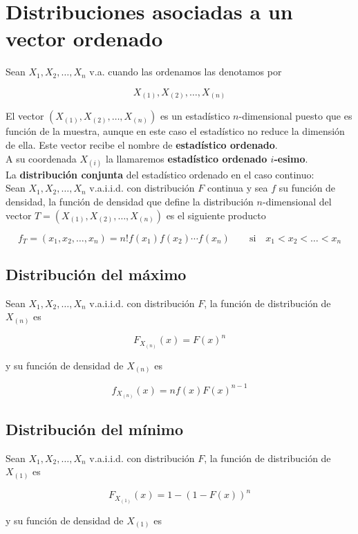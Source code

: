 \documentclass{article}
\begin{document}
\section{Distribuciones asociadas a un vector ordenado}


Sean $X_1, X_2, \dots, X_n$ v.a. cuando las ordenamos las denotamos por

\[ X_{(1)}, X_{(2)}, \dots, X_{(n)} \]

El vector $(X_{(1)}, X_{(2)}, \dots, X_{(n)})$ es un estadístico $n$-dimensional puesto que es función de la muestra, aunque en este caso el estadístico
no reduce la dimensión de ella. Este vector recibe el nombre de \textbf{estadístico ordenado}. \\
A su coordenada $X_{(i)}$ la llamaremos \textbf{estadístico ordenado $i$-esimo}. \\

La \textbf{distribución conjunta} del estadístico ordenado en el caso continuo: \\
Sean $X_1, X_2, \dots, X_n$ v.a.i.i.d. con distribución $F$ continua y sea $f$ su función de densidad, la función de densidad que define la distribución $n$-dimensional
del vector $T = (X_{(1)}, X_{(2)}, \dots, X_{(n)})$ es el siguiente producto

\[ f_T=(x_1, x_2, \dots, x_n) = n!f(x_1)f(x_2)\dotsb f(x_n) \qquad \text{si} \quad x_1 < x_2 < \dots < x_n \]

\subsection{Distribución del máximo}

Sean $X_1, X_2, \dots, X_n$ v.a.i.i.d. con distribución $F$, la función de distribución de $X_{(n)}$ es

\[ F_{X_{(n)}}(x)=F(x)^n \]

y su función de densidad de $X_{(n)}$ es

\[ f_{X_{(n)}}(x)=nf(x)F(x)^{n-1} \]

\newpage

\subsection{Distribución del mínimo}

Sean $X_1, X_2, \dots, X_n$ v.a.i.i.d. con distribución $F$, la función de distribución de $X_{(1)}$ es

\[ F_{X_{(1)}}(x)=1 - (1 - F(x))^n \]

y su función de densidad de $X_{(1)}$ es
\end{document}
